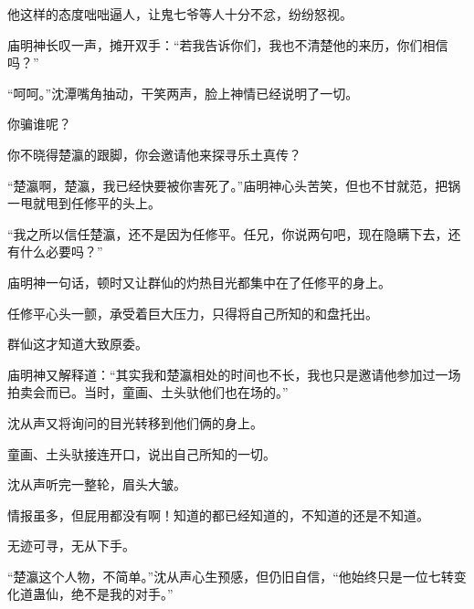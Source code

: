 \begin{this_body}
他这样的态度咄咄逼人，让鬼七爷等人十分不忿，纷纷怒视。

庙明神长叹一声，摊开双手：“若我告诉你们，我也不清楚他的来历，你们相信吗？”

“呵呵。”沈潭嘴角抽动，干笑两声，脸上神情已经说明了一切。

你骗谁呢？

你不晓得楚瀛的跟脚，你会邀请他来探寻乐土真传？

“楚瀛啊，楚瀛，我已经快要被你害死了。”庙明神心头苦笑，但也不甘就范，把锅一甩就甩到任修平的头上。

“我之所以信任楚瀛，还不是因为任修平。任兄，你说两句吧，现在隐瞒下去，还有什么必要吗？”

庙明神一句话，顿时又让群仙的灼热目光都集中在了任修平的身上。

任修平心头一颤，承受着巨大压力，只得将自己所知的和盘托出。

群仙这才知道大致原委。

庙明神又解释道：“其实我和楚瀛相处的时间也不长，我也只是邀请他参加过一场拍卖会而已。当时，童画、土头驮他们也在场的。”

沈从声又将询问的目光转移到他们俩的身上。

童画、土头驮接连开口，说出自己所知的一切。

沈从声听完一整轮，眉头大皱。

情报虽多，但屁用都没有啊！知道的都已经知道的，不知道的还是不知道。

无迹可寻，无从下手。

“楚瀛这个人物，不简单。”沈从声心生预感，但仍旧自信，“他始终只是一位七转变化道蛊仙，绝不是我的对手。”

\end{this_body}

